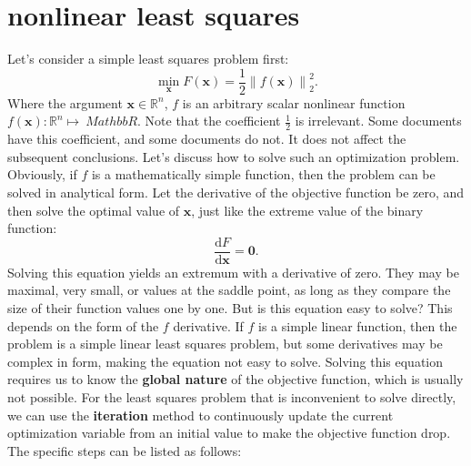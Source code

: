 \section{nonlinear least squares}
\label{sec:6.2}
Let's consider a simple least squares problem first:
\begin{equation}
\mathop {\min }\limits_{\bm{x}} F(\bm{x}) = \frac{1}{2}{\left\| {f\left( \bm{x} \right) } \right\|^2_2}.
\end{equation}
Where the argument $\bm{x} \in \mathbb{R}^n$, $f$ is an arbitrary scalar nonlinear function $f(\bm{x}): \mathbb{R}^n \mapsto \ Mathbb{R}$. Note that the coefficient $\frac{1}{2}$ is irrelevant. Some documents have this coefficient, and some documents do not. It does not affect the subsequent conclusions. Let's discuss how to solve such an optimization problem. Obviously, if $f$ is a mathematically simple function, then the problem can be solved in analytical form. Let the derivative of the objective function be zero, and then solve the optimal value of $\bm{x}$, just like the extreme value of the binary function:
\begin{equation}
\frac{ \mathrm{d} F}{ \mathrm{d} \bm{x} } = \bm{0}.
\end{equation}
Solving this equation yields an extremum with a derivative of zero. They may be maximal, very small, or values ​​at the saddle point, as long as they compare the size of their function values ​​one by one. But is this equation easy to solve? This depends on the form of the $f$ derivative. If $f$ is a simple linear function, then the problem is a simple linear least squares problem, but some derivatives may be complex in form, making the equation not easy to solve. Solving this equation requires us to know the \textbf{global nature} of the objective function, which is usually not possible. For the least squares problem that is inconvenient to solve directly, we can use the \textbf{iteration} method to continuously update the current optimization variable from an initial value to make the objective function drop. The specific steps can be listed as follows:

